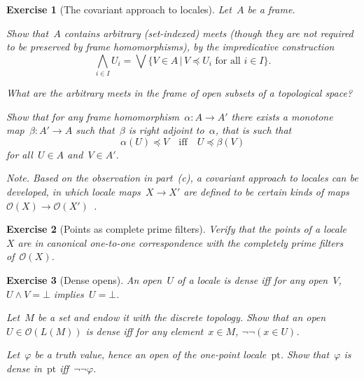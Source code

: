\documentclass{ws-rv9x6}
\newtheorem{ex}{Exercise}
\newenvironment{exercise}[1]{
  \begin{ex}[#1]
}{\end{ex}}
\renewcommand{\O}{\mathcal{O}}
\renewcommand{\_}{\mathpunct{.}}
\newcommand{\?}{\,{:}\,}
\newcommand{\pt}{\mathrm{pt}}
\begin{document}
\begin{exercise}{The covariant approach to locales}%
Let~$A$ be a frame.
\begin{alphlist}[(c)]
\item Show that~$A$ contains arbitrary (set-indexed) meets (though they are not
required to be preserved by frame homomorphisms), by the impredicative
construction
\[ \bigwedge_{i \in I} U_i = \bigvee\{ V \in A \,|\, \text{$V \preceq U_i$ for all~$i \in I$}
\}. \]
\item What are the arbitrary meets in the frame of open subsets of a
topological space?
\item Show that for any frame homomorphism~$\alpha : A \to A'$ there exists a
monotone map~$\beta : A' \to A$ such that~\emph{$\beta$ is right adjoint
to~$\alpha$}, that is such that
\[ \alpha(U) \preceq V \quad\text{iff}\quad U \preceq \beta(V) \]
for all~$U \in A$ and~$V \in A'$.
\end{alphlist}
{\scriptsize\emph{Note.} Based on the observation in part~(c), a
\emph{covariant approach} to locales can be developed, in which locale maps~$X
\to X'$ are defined to be certain kinds of maps~$\O(X) \to
\O(X')$~\cite{picado-pultr:covariant}.\par}
\end{exercise}

\begin{exercise}{Points as complete prime filters}%
\label{ex:points-as-filters}%
Verify that the points of a locale~$X$ are in canonical one-to-one correspondence
with the completely prime filters of~$\O(X)$.
\end{exercise}

\begin{exercise}{Dense opens}%
\label{ex:dense-opens}%
An open~$U$ of a locale is \emph{dense} iff for any open~$V$, $U \wedge V =
\bot$ implies~$U = \bot$.
\begin{alphlist}[(b)]
\item Let~$M$ be a set and endow it with the discrete topology. Show that an
open~$U \in \O(L(M))$ is dense iff for any element~$x \in M$, $\neg\neg(x \in
U)$.
\item Let~$\varphi$ be a truth value, hence an open of the one-point
locale~$\pt$. Show that~$\varphi$ is dense in~$\pt$ iff~$\neg\neg\varphi$.
\end{alphlist}
\end{exercise}
\end{document}
